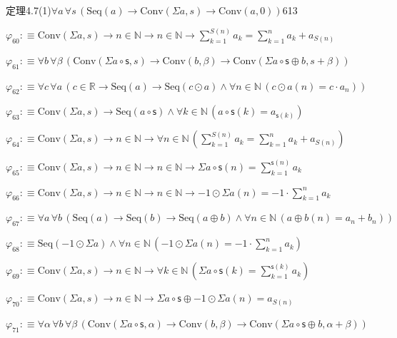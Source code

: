 \begin{fullproof}{定理4.7(1)}{$\forall a\,\forall s\,(\mathrm{Seq}(a) \to \mathrm{Conv}(\Sigma a,s) \to \mathrm{Conv}(a,0))$}{613}
\begin{abbrevlist}
\item $\varphi_{60} :\equiv \mathrm{Conv}(\Sigma a,s) \to n \in \mathbb{N} \to n \in \mathbb{N} \to {\textstyle\sum_{k=1}^{S(n)} a_{k}} = {\textstyle\sum_{k=1}^{n} a_{k}} + a_{S(n)}$
\item $\varphi_{61} :\equiv \forall b\,\forall \beta\,(\mathrm{Conv}(\Sigma a \circ \mathsf{s},s) \to \mathrm{Conv}(b,\beta) \to \mathrm{Conv}(\Sigma a \circ \mathsf{s} \oplus b,s + \beta))$
\item $\varphi_{62} :\equiv \forall c\,\forall a\,(c \in \mathbb{R} \to \mathrm{Seq}(a) \to \mathrm{Seq}(c \odot a) \land \forall n \in \mathbb{N}\,(c \odot a(n) = c \cdot a_{n}))$
\item $\varphi_{63} :\equiv \mathrm{Conv}(\Sigma a,s) \to \mathrm{Seq}(a \circ \mathsf{s}) \land \forall k \in \mathbb{N}\,(a \circ \mathsf{s}(k) = a_{\mathsf{s}(k)})$
\item $\varphi_{64} :\equiv \mathrm{Conv}(\Sigma a,s) \to n \in \mathbb{N} \to \forall n \in \mathbb{N}\,({\textstyle\sum_{k=1}^{S(n)} a_{k}} = {\textstyle\sum_{k=1}^{n} a_{k}} + a_{S(n)})$
\item $\varphi_{65} :\equiv \mathrm{Conv}(\Sigma a,s) \to n \in \mathbb{N} \to n \in \mathbb{N} \to \Sigma a \circ \mathsf{s}(n) = {\textstyle\sum_{k=1}^{\mathsf{s}(n)} a_{k}}$
\item $\varphi_{66} :\equiv \mathrm{Conv}(\Sigma a,s) \to n \in \mathbb{N} \to n \in \mathbb{N} \to -1 \odot \Sigma a(n) = -1 \cdot {\textstyle\sum_{k=1}^{n} a_{k}}$
\item $\varphi_{67} :\equiv \forall a\,\forall b\,(\mathrm{Seq}(a) \to \mathrm{Seq}(b) \to \mathrm{Seq}(a \oplus b) \land \forall n \in \mathbb{N}\,(a \oplus b(n) = a_{n} + b_{n}))$
\item $\varphi_{68} :\equiv \mathrm{Seq}(-1 \odot \Sigma a) \land \forall n \in \mathbb{N}\,(-1 \odot \Sigma a(n) = -1 \cdot {\textstyle\sum_{k=1}^{n} a_{k}})$
\item $\varphi_{69} :\equiv \mathrm{Conv}(\Sigma a,s) \to n \in \mathbb{N} \to \forall k \in \mathbb{N}\,(\Sigma a \circ \mathsf{s}(k) = {\textstyle\sum_{k=1}^{\mathsf{s}(k)} a_{k}})$
\item $\varphi_{70} :\equiv \mathrm{Conv}(\Sigma a,s) \to n \in \mathbb{N} \to \Sigma a \circ \mathsf{s} \oplus -1 \odot \Sigma a(n) = a_{S(n)}$
\item $\varphi_{71} :\equiv \forall \alpha\,\forall b\,\forall \beta\,(\mathrm{Conv}(\Sigma a \circ \mathsf{s},\alpha) \to \mathrm{Conv}(b,\beta) \to \mathrm{Conv}(\Sigma a \circ \mathsf{s} \oplus b,\alpha + \beta))$

\end{abbrevlist}
\end{fullproof}
